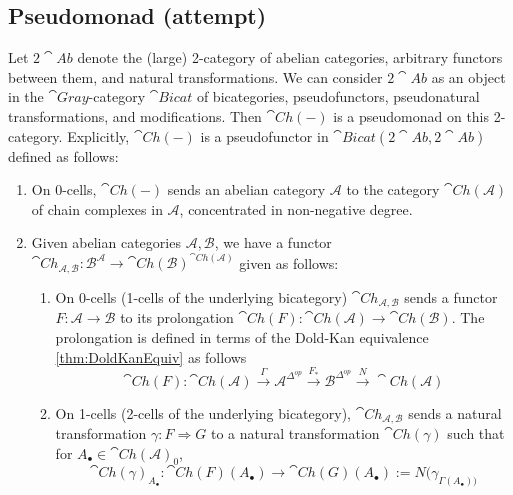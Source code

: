 \subsection{Pseudomonad (attempt)}

Let $2\cat{Ab}$ denote the (large) 2-category of abelian categories, arbitrary functors between them, and natural transformations. We can consider $2\cat{Ab}$ as an object in the $\cat{Gray}$-category $\cat{Bicat}$ of bicategories, pseudofunctors, pseudonatural transformations, and modifications. Then $\cat{Ch}(-)$ is a pseudomonad on this 2-category. Explicitly, $\cat{Ch}(-)$ is a pseudofunctor in $\cat{Bicat}(2\cat{Ab},2\cat{Ab})$ defined as follows:
\begin{enumerate}
    \item On 0-cells, $\cat{Ch}(-)$ sends an abelian category $\mathcal{A}$ to the category $\cat{Ch}(\mathcal{A})$ of chain complexes in $\mathcal{A}$, concentrated in non-negative degree.
    \item Given abelian categories $\mathcal{A},\mathcal{B}$, we have a functor $\cat{Ch}_{\mathcal{A},\mathcal{B}}:\mathcal{B}^\mathcal{A}\rightarrow \cat{Ch}(\mathcal{B})^{\cat{Ch}(\mathcal{A})}$ given as follows:
    \begin{enumerate}
        \item On 0-cells (1-cells of the underlying bicategory) $\cat{Ch}_{\mathcal{A},\mathcal{B}}$ sends a functor $F:\mathcal{A}\rightarrow \mathcal{B}$ to its prolongation $\cat{Ch}(F):\cat{Ch}(\mathcal{A})\rightarrow \cat{Ch}(\mathcal{B})$. The prolongation is defined in terms of the Dold-Kan equivalence \ref{thm:DoldKanEquiv} as follows
        \begin{equation*}
            \cat{Ch}(F):\cat{Ch}(\mathcal{A})\xrightarrow{\Gamma}\mathcal{A}^{\Delta^{op}}\xrightarrow{F_*}\mathcal{B}^{\Delta^{op}}\xrightarrow{N}\cat{Ch}(\mathcal{A})
        \end{equation*}
        \item On 1-cells (2-cells of the underlying bicategory), $\cat{Ch}_{\mathcal{A},\mathcal{B}}$ sends a natural transformation $\gamma:F\Rightarrow G$ to a natural transformation $\cat{Ch}(\gamma)$ such that for $A_\bullet \in \cat{Ch}(\mathcal{A})_0$,
        \begin{equation*}
            \cat{Ch}(\gamma)_{A_\bullet}:\cat{Ch}(F)(A_\bullet)\rightarrow \cat{Ch}(G)(A_\bullet) := N(\gamma_{\Gamma(A_\bullet))}
        \end{equation*}
    \end{enumerate}

\end{enumerate}

